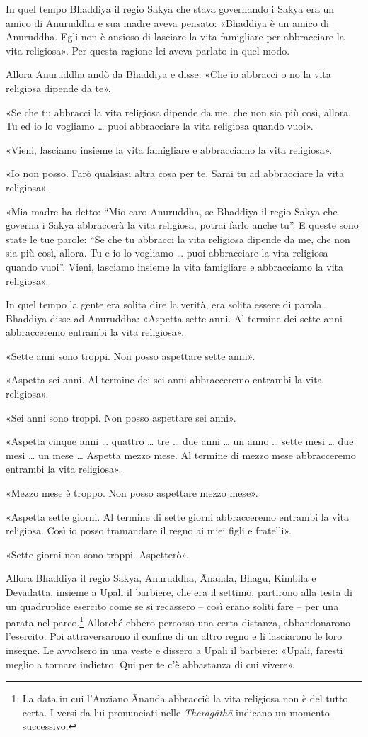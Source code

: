 In quel tempo Bhaddiya il regio Sakya che stava governando i Sakya era un amico
di Anuruddha e sua madre aveva pensato: «Bhaddiya è un amico di Anuruddha. Egli
non è ansioso di lasciare la vita famigliare per abbracciare la vita religiosa».
Per questa ragione lei aveva parlato in quel modo.

Allora Anuruddha andò da Bhaddiya e disse: «Che io abbracci o no la vita
religiosa dipende da te».

«Se che tu abbracci la vita religiosa dipende da me, che non sia più così,
allora. Tu ed io lo vogliamo … puoi abbracciare la vita religiosa quando vuoi».

«Vieni, lasciamo insieme la vita famigliare e abbracciamo la vita religiosa».

«Io non posso. Farò qualsiasi altra cosa per te. Sarai tu ad abbracciare la vita
religiosa».

«Mia madre ha detto: “Mio caro Anuruddha, se Bhaddiya il regio Sakya che governa
i Sakya abbraccerà la vita religiosa, potrai farlo anche tu”. E queste sono
state le tue parole: “Se che tu abbracci la vita religiosa dipende da me, che
non sia più così, allora. Tu e io lo vogliamo … puoi abbracciare la vita
religiosa quando vuoi”. Vieni, lasciamo insieme la vita famigliare e abbracciamo
la vita religiosa».

In quel tempo la gente era solita dire la verità, era solita essere di parola.
Bhaddiya disse ad Anuruddha: «Aspetta sette anni. Al termine dei sette anni
abbracceremo entrambi la vita religiosa».

«Sette anni sono troppi. Non posso aspettare sette anni».

«Aspetta sei anni. Al termine dei sei anni abbracceremo entrambi la vita
religiosa».

«Sei anni sono troppi. Non posso aspettare sei anni».

«Aspetta cinque anni … quattro … tre … due anni … un anno … sette mesi … due
mesi … un mese … Aspetta mezzo mese. Al termine di mezzo mese abbracceremo
entrambi la vita religiosa».

«Mezzo mese è troppo. Non posso aspettare mezzo mese».

«Aspetta sette giorni. Al termine di sette giorni abbracceremo entrambi la vita
religiosa. Così io posso tramandare il regno ai miei figli e fratelli».

«Sette giorni non sono troppi. Aspetterò».

Allora Bhaddiya il regio Sakya, Anuruddha, Ānanda, Bhagu, Kimbila e Devadatta,
insieme a Upāli il barbiere, che era il settimo, partirono alla testa di un
quadruplice esercito come se si recassero – così erano soliti fare – per una
parata nel parco.\footnote{La data in cui l’Anziano Ānanda abbracciò la vita
  religiosa non è del tutto certa. I versi da lui pronunciati nelle
  \emph{Theragāthā} indicano un momento successivo.} Allorché ebbero percorso
una certa distanza, abbandonarono l’esercito. Poi attraversarono il confine di
un altro regno e lì lasciarono le loro insegne. Le avvolsero in una veste e
dissero a Upāli il barbiere: «Upāli, faresti meglio a tornare indietro. Qui per
te c’è abbastanza di cui vivere».

